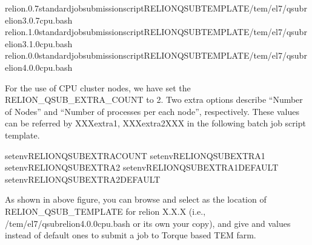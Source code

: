 \documentclass[a4paper,11pt,english]{sphinxmanual}
\begin{document}
\begin{sphinxVerbatim}[commandchars=\\\{\}]
relion.0.7standardjobsubmissionscriptRELION\PYGZus{}QSUB\PYGZus{}TEMPLATE/tem/el7/qsub\PYGZhy{}relion\PYGZhy{}3.0.7\PYGZhy{}cpu.bash
relion.1.0standardjobsubmissionscriptRELION\PYGZus{}QSUB\PYGZus{}TEMPLATE/tem/el7/qsub\PYGZhy{}relion\PYGZhy{}3.1.0\PYGZhy{}cpu.bash
relion.0.0standardjobsubmissionscriptRELION\PYGZus{}QSUB\PYGZus{}TEMPLATE/tem/el7/qsub\PYGZhy{}relion\PYGZhy{}4.0.0\PYGZhy{}cpu.bash
\end{sphinxVerbatim}

\sphinxAtStartPar
For the use of CPU cluster nodes, we have set the RELION\_QSUB\_EXTRA\_COUNT to 2. Two extra options describe “Number of Nodes” and “Number of processes per each node”, respectively. These values can be referred by XXXextra1, XXXextra2XXX in the following batch job script template.

\begin{sphinxVerbatim}[commandchars=\\\{\}]
setenvRELION\PYGZus{}QSUB\PYGZus{}EXTRA\PYGZus{}COUNT
setenvRELION\PYGZus{}QSUB\PYGZus{}EXTRA1
setenvRELION\PYGZus{}QSUB\PYGZus{}EXTRA2
setenvRELION\PYGZus{}QSUB\PYGZus{}EXTRA1\PYGZus{}DEFAULT
setenvRELION\PYGZus{}QSUB\PYGZus{}EXTRA2\PYGZus{}DEFAULT
\end{sphinxVerbatim}


\sphinxAtStartPar
As shown in above figure, you can browse and select  as the location of RELION\_QSUB\_TEMPLATE for relion X.X.X (i.e., /tem/el7/qsub\sphinxhyphen{}relion\sphinxhyphen{}4.0.0\sphinxhyphen{}cpu.bash or its own your copy),
and give  and  values instead of default ones to submit a job to Torque based TEM farm.
\end{document}
